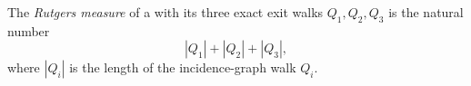 \begin{definition}
The \emph{Rutgers measure} of a
 with its three exact exit walks
\(Q_1,Q_2,Q_3\) is the natural number
\[
                           |Q_1|+|Q_2|+|Q_3|,
\]
where \(|Q_i|\) is the length of the incidence-graph walk \(Q_i\).
\end{definition}
